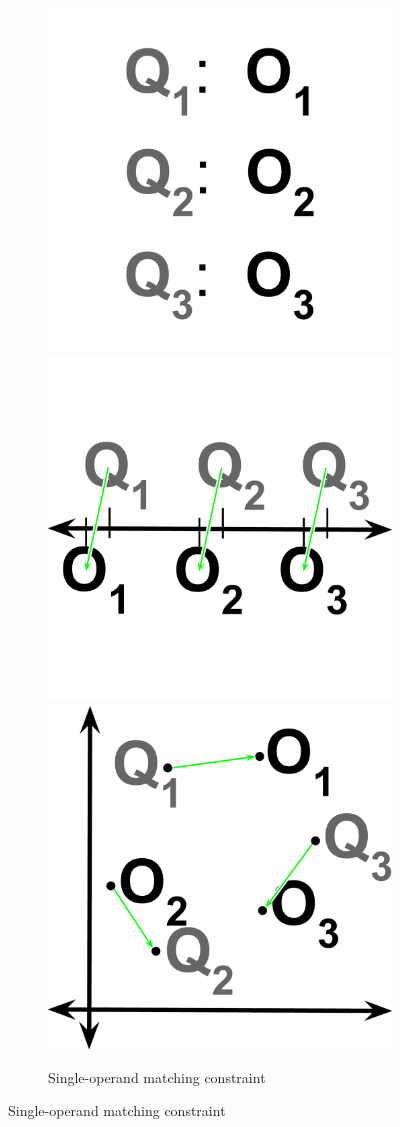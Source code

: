 \begin{figure}
\begin{center}

\begin{subfigure}[b]{\columnwidth}
\centering
\includegraphics[width=0.33\columnwidth]{img/1d-2d-single-double/single}%
\includegraphics[width=0.33\columnwidth]{img/1d-2d-single-double/1d-single}%
\includegraphics[width=0.33\columnwidth]{img/1d-2d-single-double/2d-single}
\caption{
Single-operand matching constraint
}
\label{fig:single}
\end{subfigure}


\end{center}
\end{figure}

